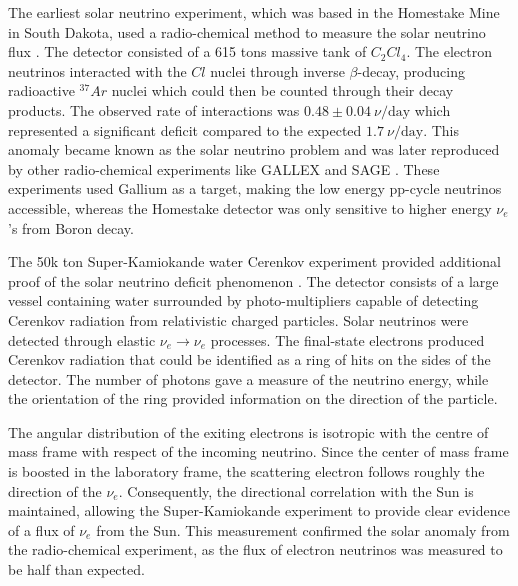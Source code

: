 The earliest solar neutrino experiment, which was based in the Homestake Mine in South Dakota, used a radio-chemical method to measure the solar neutrino flux \cite{Lande:2003ex}. The detector consisted of a 615 tons massive tank of $C_2Cl_4$. The electron neutrinos interacted with the $Cl$ nuclei through inverse $\beta$-decay, producing radioactive $^{37}Ar$ nuclei which could then be counted through their decay products. The observed rate of interactions was $0.48\pm0.04 \ \nu/\text{day}$ which represented a significant deficit compared to the expected $1.7 \ \nu/\text{day}$. This anomaly became known as the solar neutrino problem and was later reproduced by other radio-chemical experiments like GALLEX \cite{GNO:2005bds} and SAGE \cite{SAGE:2002fps}. These experiments used Gallium as a target, making the low energy pp-cycle neutrinos accessible, whereas the Homestake detector was only sensitive to higher energy $\nu_e$'s from Boron decay.

The 50k ton Super-Kamiokande water Cerenkov experiment provided additional proof of the solar neutrino deficit phenomenon \cite{Super-Kamiokande:2001ljr}. The detector consists of a large vessel containing water surrounded by photo-multipliers capable of detecting Cerenkov radiation from relativistic charged particles. Solar neutrinos were detected through elastic $\nu_e \rightarrow \nu_e$ processes. The final-state electrons produced Cerenkov radiation that could be identified as a ring of hits on the sides of the detector. The number of photons gave a measure of the neutrino energy, while the orientation of the ring provided information on the direction of the particle. 

The angular distribution of the exiting electrons is isotropic with the centre of mass frame with respect of the incoming neutrino. Since the center of mass frame is boosted in the laboratory frame, the scattering electron follows roughly the direction of the $\nu_e$. Consequently, the directional correlation with the Sun is maintained, allowing the Super-Kamiokande experiment to provide clear evidence of a flux of $\nu_e$ from the Sun. This measurement confirmed the solar anomaly from the radio-chemical experiment, as the flux of electron neutrinos was measured to be half than expected.

